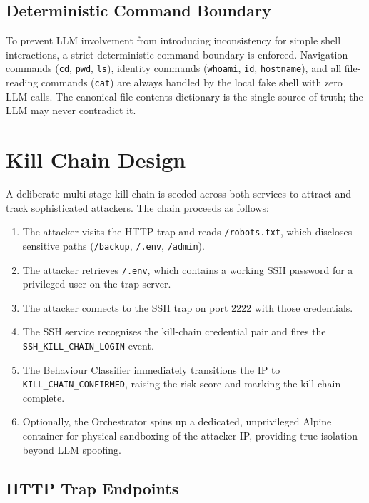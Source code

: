 \subsection{Deterministic Command Boundary}

To prevent LLM involvement from introducing inconsistency for simple shell interactions, a strict deterministic command boundary is enforced. Navigation commands (\texttt{cd}, \texttt{pwd}, \texttt{ls}), identity commands (\texttt{whoami}, \texttt{id}, \texttt{hostname}), and all file-reading commands (\texttt{cat}) are always handled by the local fake shell with zero LLM calls. The canonical file-contents dictionary is the single source of truth; the LLM may never contradict it.

\section{Kill Chain Design}

A deliberate multi-stage kill chain is seeded across both services to attract and track sophisticated attackers. The chain proceeds as follows:

\begin{enumerate}
    \item The attacker visits the \ac{HTTP} trap and reads \texttt{/robots.txt}, which discloses sensitive paths (\texttt{/backup}, \texttt{/.env}, \texttt{/admin}).
    \item The attacker retrieves \texttt{/.env}, which contains a working \ac{SSH} password for a privileged user on the trap server.
    \item The attacker connects to the \ac{SSH} trap on port 2222 with those credentials.
    \item The \ac{SSH} service recognises the kill-chain credential pair and fires the \texttt{SSH\_KILL\_CHAIN\_LOGIN} event.
    \item The Behaviour Classifier immediately transitions the IP to \texttt{KILL\_CHAIN\_CONFIRMED}, raising the risk score and marking the kill chain complete.
    \item Optionally, the Orchestrator spins up a dedicated, unprivileged Alpine container for physical sandboxing of the attacker IP, providing true isolation beyond LLM spoofing.
\end{enumerate}

\subsection{HTTP Trap Endpoints}

